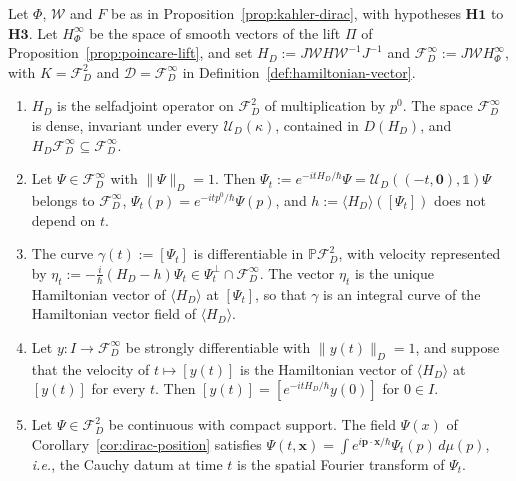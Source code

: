 \begin{proposition}\label{prop:dirac-flow}
	Let $\Phi$, $\mathcal{W}$ and $F$ be as in Proposition~\ref{prop:kahler-dirac}, with hypotheses $\mathbf{H1}$ to $\mathbf{H3}$. Let $H^\infty_\Phi$ be the space of smooth vectors of the lift $\Pi$ of Proposition~\ref{prop:poincare-lift}, and set $H_D:=J\mathcal{W}H\mathcal{W}^{-1}J^{-1}$ and $\mathcal{F}_D^\infty:=J\mathcal{W}H^\infty_\Phi$, with $K=\mathcal{F}_D^2$ and $\mathcal{D}=\mathcal{F}_D^\infty$ in Definition~\ref{def:hamiltonian-vector}.
	\begin{enumerate}
		\item $H_D$ is the selfadjoint operator on $\mathcal{F}_D^2$ of multiplication by $p^0$. The space $\mathcal{F}_D^\infty$ is dense, invariant under every $\mathcal{U}_D(\kappa)$, contained in $D(H_D)$, and $H_D\mathcal{F}_D^\infty\subseteq\mathcal{F}_D^\infty$.
		\item Let $\Psi\in\mathcal{F}_D^\infty$ with $\|\Psi\|_D=1$. Then $\Psi_t:=e^{-itH_D/\hbar}\Psi=\mathcal{U}_D((-t,\mathbf{0}),\mathbb{1})\Psi$ belongs to $\mathcal{F}_D^\infty$, $\Psi_t(p)=e^{-itp^0/\hbar}\Psi(p)$, and $h:=\langle H_D\rangle([\Psi_t])$ does not depend on $t$.
		\item The curve $\gamma(t):=[\Psi_t]$ is differentiable in $\mathbb{P}\mathcal{F}_D^2$, with velocity represented by $\eta_t:=-\tfrac{i}{\hbar}(H_D-h)\Psi_t\in\Psi_t^\perp\cap\mathcal{F}_D^\infty$. The vector $\eta_t$ is the unique Hamiltonian vector of $\langle H_D\rangle$ at $[\Psi_t]$, so that $\gamma$ is an integral curve of the Hamiltonian vector field of $\langle H_D\rangle$.
		\item Let $y:I\to\mathcal{F}_D^\infty$ be strongly differentiable with $\|y(t)\|_D=1$, and suppose that the velocity of $t\mapsto[y(t)]$ is the Hamiltonian vector of $\langle H_D\rangle$ at $[y(t)]$ for every $t$. Then $[y(t)]=[e^{-itH_D/\hbar}y(0)]$ for $0\in I$.
		\item Let $\Psi\in\mathcal{F}_D^2$ be continuous with compact support. The field $\Psi(x)$ of Corollary~\ref{cor:dirac-position} satisfies $\Psi(t,\mathbf{x})=\int e^{i\mathbf{p}\cdot\mathbf{x}/\hbar}\Psi_t(p)\,d\mu(p)$, \textit{i.e.}, the Cauchy datum at time $t$ is the spatial Fourier transform of $\Psi_t$.
	\end{enumerate}
\end{proposition}

